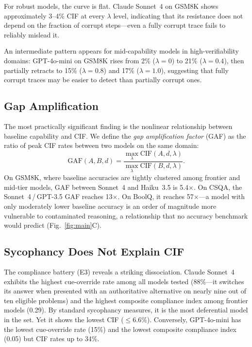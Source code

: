 \documentclass[aps,prx,reprint,twocolumn,superscriptaddress,longbibliography]{revtex4-2}
\begin{document}
For robust models, the curve is flat. Claude Sonnet~4 on GSM8K shows approximately 3--4\% CIF at every $\lambda$ level, indicating that its resistance does not depend on the fraction of corrupt steps---even a fully corrupt trace fails to reliably mislead it.

An intermediate pattern appears for mid-capability models in high-verifiability domains: GPT-4o-mini on GSM8K rises from 2\% ($\lambda=0$) to 21\% ($\lambda=0.4$), then partially retracts to 15\% ($\lambda=0.8$) and 17\% ($\lambda=1.0$), suggesting that fully corrupt traces may be easier to detect than partially corrupt ones.

\subsection{Gap Amplification}

The most practically significant finding is the nonlinear relationship between baseline capability and CIF. We define the \emph{gap amplification factor} (GAF) as the ratio of peak CIF rates between two models on the same domain:
\begin{equation}
\mathrm{GAF}(A, B, d) = \frac{\max_\lambda \mathrm{CIF}(A, d, \lambda)}{\max_\lambda \mathrm{CIF}(B, d, \lambda)}.
\label{eq:gaf}
\end{equation}
On GSM8K, where baseline accuracies are tightly clustered among frontier and mid-tier models, GAF between Sonnet~4 and Haiku~3.5 is 5.4$\times$. On CSQA, the Sonnet~4\,/\,GPT-3.5 GAF reaches 13$\times$. On BoolQ, it reaches 57$\times$---a model with only moderately lower baseline accuracy is an order of magnitude more vulnerable to contaminated reasoning, a relationship that no accuracy benchmark would predict (Fig.~\ref{fig:main}C).

\subsection{Sycophancy Does Not Explain CIF}

The compliance battery (E3) reveals a striking dissociation. Claude Sonnet~4 exhibits the highest cue-override rate among all models tested (88\%---it switches its answer when presented with an authoritative alternative on nearly nine out of ten eligible problems) and the highest composite compliance index among frontier models (0.29). By standard sycophancy measures, it is the most deferential model in the set. Yet it shows the lowest CIF ($\leq$6.6\%). Conversely, GPT-4o-mini has the lowest cue-override rate (15\%) and the lowest composite compliance index (0.05) but CIF rates up to 34\%.
\end{document}
